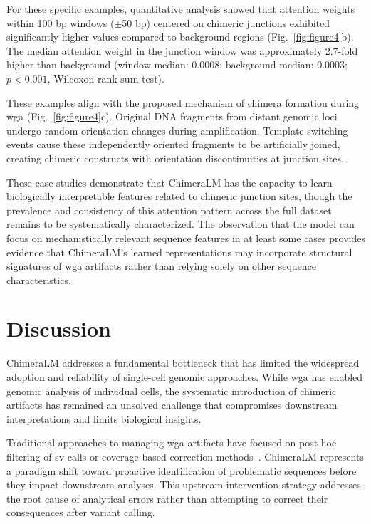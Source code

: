 \documentclass[pdflatex,sn-nature]{sn-jnl}%
\theoremstyle{thmstyleone}%
\theoremstyle{thmstyletwo}%
\theoremstyle{thmstylethree}%
\begin{document}
For these specific examples, quantitative analysis showed that attention weights within 100 bp windows ($\pm$50 bp) centered on chimeric junctions exhibited significantly higher values compared to background regions (Fig.~\ref{fig:figure4}b).
The median attention weight in the junction window was approximately 2.7-fold higher than background (window median: 0.0008; background median: 0.0003; $p < 0.001$, Wilcoxon rank-sum test).

These examples align with the proposed mechanism of chimera formation during \gls{wga} (Fig.~\ref{fig:figure4}c).
Original DNA fragments from distant genomic loci undergo random orientation changes during amplification.
Template switching events cause these independently oriented fragments to be artificially joined, creating chimeric constructs with orientation discontinuities at junction sites.

These case studies demonstrate that ChimeraLM has the capacity to learn biologically interpretable features related to chimeric junction sites, though the prevalence and consistency of this attention pattern across the full dataset remains to be systematically characterized.
The observation that the model can focus on mechanistically relevant sequence features in at least some cases provides evidence that ChimeraLM's learned representations may incorporate structural signatures of \gls{wga} artifacts rather than relying solely on other sequence characteristics.

\section*{Discussion}
ChimeraLM addresses a fundamental bottleneck that has limited the widespread adoption and reliability of single-cell genomic approaches.
While \gls{wga} has enabled genomic analysis of individual cells, the systematic introduction of chimeric artifacts has remained an unsolved challenge that compromises downstream interpretations and limits biological insights.

Traditional approaches to managing \gls{wga} artifacts have focused on post-hoc filtering of \gls{sv} calls or coverage-based correction methods~\cite{kiguchi2021long, lu2023exploration}.
ChimeraLM represents a paradigm shift toward proactive identification of problematic sequences before they impact downstream analyses.
This upstream intervention strategy addresses the root cause of analytical errors rather than attempting to correct their consequences after variant calling.
\end{document}

